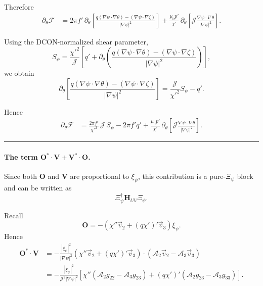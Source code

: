 \documentclass[10pt,a4paper]{article}
\numberwithin{equation}{section}
\begin{document}
Therefore
\begin{align}
\partial_\theta \mathcal F
&=
2\pi f'\,
\partial_\theta
\left[
\frac{
q(\nabla\psi\cdot\nabla\theta)-(\nabla\psi\cdot\nabla\zeta)
}{
|\nabla\psi|^2
}
\right]
+
\frac{\mu_0p'}{\chi'}\,
\partial_\theta
\left[
\mathcal J\frac{\nabla\psi\cdot\nabla\theta}{|\nabla\psi|^2}
\right].
\end{align}

Using the DCON-normalized shear parameter,
\begin{equation}
S_\psi
=
\frac{\chi'^2}{\mathcal J}
\left[
q'
+
\partial_\theta
\left(
\frac{
q(\nabla\psi\cdot\nabla\theta)-(\nabla\psi\cdot\nabla\zeta)
}{
|\nabla\psi|^2
}
\right)
\right],
\end{equation}
we obtain
\begin{equation}
\partial_\theta
\left[
\frac{
q(\nabla\psi\cdot\nabla\theta)-(\nabla\psi\cdot\nabla\zeta)
}{
|\nabla\psi|^2
}
\right]
=
\frac{\mathcal J}{\chi'^2}S_\psi-q'.
\end{equation}

Hence
\begin{align}
\partial_\theta\mathcal F
&=
\frac{2\pi f'}{\chi'^2}\,\mathcal J\,S_\psi
-
2\pi f'q'
+
\frac{\mu_0p'}{\chi'}\,
\partial_\theta
\left[
\mathcal J\frac{\nabla\psi\cdot\nabla\theta}{|\nabla\psi|^2}
\right].
\end{align}

\medskip
\noindent\rule{\linewidth}{0.4pt}
\medskip

\paragraph{The term $\mathbf O^*\cdot\mathbf V+\mathbf V^*\cdot\mathbf O$.}

Since both $\mathbf O$ and $\mathbf V$ are proportional to $\xi_\psi$, this contribution is a pure-$\Xi_\psi$ block and can be written as
\[
\Xi_\psi^\dagger \mathbf H_{UV} \Xi_\psi.
\]

Recall
\begin{equation}
\mathbf O
=
-\left(
\chi''\vec v_2+(q\chi')'\vec v_3
\right)\xi_\psi.
\end{equation}
Hence
\begin{align}
\mathbf O^*\cdot\mathbf V
&=
-\frac{|\xi_\psi|^2}{|\nabla\psi|^2}
\left(
\chi''\vec v_2+(q\chi')'\vec v_3
\right)\cdot
\left(
\mathcal A_2\vec v_2-\mathcal A_3\vec v_3
\right) \\
&=
-\frac{|\xi_\psi|^2}{\mathcal J^2|\nabla\psi|^2}
\left[
\chi''(\mathcal A_2 g_{22}-\mathcal A_3 g_{23})
+
(q\chi')'(\mathcal A_2 g_{23}-\mathcal A_3 g_{33})
\right].
\end{align}
\end{document}
